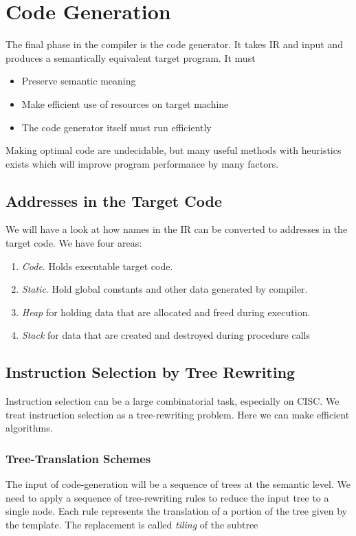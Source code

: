 \documentclass{article}
\begin{document}

\section{Code Generation} %
\label{sec:Code Generation}
The final phase in the compiler is the code generator. It takes IR and input and produces a semantically equivalent target program. It must
\begin{itemize}
	\item Preserve semantic meaning
	\item Make efficient use of resources on target machine
	\item The code generator itself must run efficiently
\end{itemize}
Making optimal code are undecidable, but many useful methods with heuristics exists which will improve program performance by many factors.

\subsection{Addresses in the Target Code} %
\label{sub:Addresses in the Target Code}
We will have a look at how names in the IR can be converted to addresses in the target code. We have four areas:
\begin{enumerate}
	\item \emph{Code}. Holds executable target code.
	\item \emph{Static}. Hold global constants and other data generated by compiler.
	\item \emph{Heap} for holding data that are allocated and freed during execution.
	\item \emph{Stack} for data that are created and destroyed during procedure calls
\end{enumerate}


\subsection{Instruction Selection by Tree Rewriting} %
\label{sub:Instruction Selection by Tree Rewriting}
Instruction selection can be a large combinatorial task, especially on CISC. We treat instruction selection as a tree-rewriting problem. Here we can make efficient algorithms.

\subsubsection{Tree-Translation Schemes} %
\label{ssub:Tree-Translation Schemes}
The input of code-generation will be a sequence of trees at the semantic level. We need to apply a sequence of tree-rewriting rules to reduce the input tree to a single node. Each rule represents the translation of a portion of the tree given by the template. The replacement is called \emph{tiling} of the subtree
\end{document}
